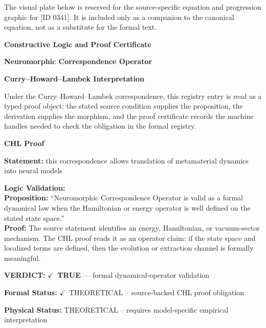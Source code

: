 \begingroup\footnotesize\sloppy
The visual plate below is reserved for the source-specific equation and progression graphic for [ID 0341]. It is included only as a companion to the canonical equation, not as a substitute for the formal text.
\par\endgroup
\ifTZPDarkEdition
{}
\fi

\clearpage
\begingroup\tzpsupportsetup
\noindent\textbf{\fontsize{10.8pt}{12.8pt}\selectfont [ID 0341] Constructive Logic and Proof Certificate}\par
\noindent\textbf{\fontsize{10pt}{12pt}\selectfont Neuromorphic Correspondence Operator}\par
\vspace{0.45em}
\begingroup
\footnotesize
\setlength{\parskip}{0.22em}
\setlength{\parindent}{0pt}
\noindent\textbf{Curry--Howard--Lambek Interpretation}\par
Under the Curry--Howard--Lambek correspondence, this registry entry is read as a typed proof
object: the stated source condition supplies the proposition, the derivation supplies the
morphism, and the proof certificate records the machine handles needed to check the obligation
in the formal registry.

\vspace{0.45em}
\noindent\textbf{CHL Proof}\par
\textbf{Statement:} this correspondence allows translation of metamaterial dynamics into neural models

\textbf{Logic Validation:}\\
\textbf{Proposition:} ``Neuromorphic Correspondence Operator is valid as a formal dynamical law when the
Hamiltonian or energy operator is well defined on the stated state space.''\\
\textbf{Proof:} The source statement identifies an energy, Hamiltonian, or vacuum-sector mechanism. The
CHL proof reads it as an operator claim: if the state space and localized terms are
defined, then the evolution or extraction channel is formally meaningful.

\textbf{VERDICT:} \ensuremath{\checkmark}\ \textbf{TRUE} --- formal dynamical-operator validation

\textbf{Formal Status:} \ensuremath{\checkmark}\ THEORETICAL -- source-backed CHL proof obligation

\textbf{Physical Status:} THEORETICAL -- requires model-specific empirical interpretation
\par\vspace{0.45em}
\par
\ifTZPDarkEdition
{}
\fi
\endgroup
\endgroup
